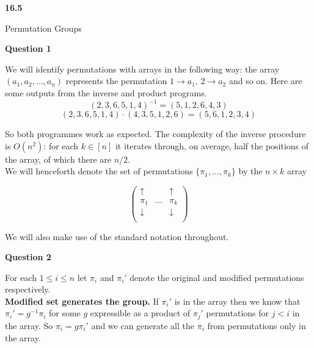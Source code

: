 \documentclass[12pt]{extarticle}
\begin{document}
\begin{flushleft}
\begin{LARGE}
\textbf{16.5}
\end{LARGE}  
\end{flushleft}

\vfill
\begin{center}
\begin{Huge}Permutation Groups\end{Huge}
\end{center}
\vfill

\pagebreak

\begin{center}
\textbf{Question 1}
\end{center}

We will identify permutations with arrays in the following way: the array $(a_1,a_2,\dots, a_n)$ represents the permutation $1 \rightarrow a_1, \, 2 \rightarrow a_2$ and so on. Here are some outputs from the inverse and product programs.
$$(2,3,6,5,1,4)^{-1} =  (5,1,2,6,4,3)$$
$$(2,3,6,5,1,4)\cdot (4,3,5,1,2,6) = (5,6,1,2,3,4)$$

So both programmes work as expected. The complexity of the inverse procedure is $O(n^2)$: for each $k \in [n]$   
it iterates through, on average, half the positions of the array, of which there are $n/2$.\\

We will henceforth denote the set of permutations $\{ \pi_1, \dots ,\pi_k \}$  by the $n \times k$ array 

$$\begin{pmatrix} 
  \uparrow &  &  \uparrow \\ 
  \pi_1 & \dots &  \pi_k \\ 
  \downarrow &  &  \downarrow \\ 
\end{pmatrix} $$

We will also make use of the standard notation throughout.


\begin{center}
\textbf{Question 2}
\end{center}

For each $1 \leq i \leq n$ let $\pi_i$ and $\pi_i'$ denote the original and modified permutations respectively. \\

\textbf{Modified set generates the group.} If $\pi_i'$ is in the array then we know that $\pi_i' = g^{-1}\pi_i$ for some $g$ expressible as a product of $\pi_j'$ permutations for $j<i$ in the array. So $\pi_i = g\pi_i'$ and we can generate all the $\pi_i$ from permutations only in the array.
\end{document}
